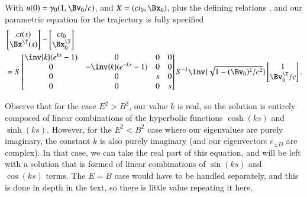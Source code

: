 {With \(u(0) = \gamma_0 (1, \Bv_0/c)\), and \(X = (c t_0, \Bx_0)\), plus the defining relations , and  our parametric equation for the trajectory is fully specified
%
\begin{equation}\label{eqn:relElectroDynProblemSet2:910}
\begin{aligned}
&\begin{bmatrix}
c t(s) \\
\Bx^\T(s)
\end{bmatrix}
-
\begin{bmatrix}
c t_0 \\
\Bx_0^\T
\end{bmatrix} \\
&= S
\begin{bmatrix}
\inv{k}(e^{ks} -1) & 0 & 0 & 0 \\
0 & -\inv{k}(e^{-ks} -1) & 0 & 0 \\
0 & 0 & s & 0 \\
0 & 0 & 0 & s \\
\end{bmatrix} S^{-1} \inv{\sqrt{1 - (\Bv_0)^2/c^2}}
\begin{bmatrix}
1 \\
\Bv_0^\T/c
\end{bmatrix}.
\end{aligned}
\end{equation}

Observe that for the case \(E^2 > B^2\), our value \(k\) is real, so the solution is entirely composed of linear combinations of the hyperbolic functions \(\cosh(k s)\) and \(\sinh(ks)\).  However, for the \(E^2 < B^2\) case where our eigenvalues are purely imaginary, the constant \(k\) is also purely imaginary (and our eigenvectors \(e_{\pm D}\) are complex).  In that case, we can take the real part of this equation, and will be left with a solution that is formed of linear combinations of \(\sin(ks)\) and \(\cos(ks)\) terms.  The \(E = B\) case would have to be handled separately, and this is done in depth in the text, so there is little value repeating it here.

}

